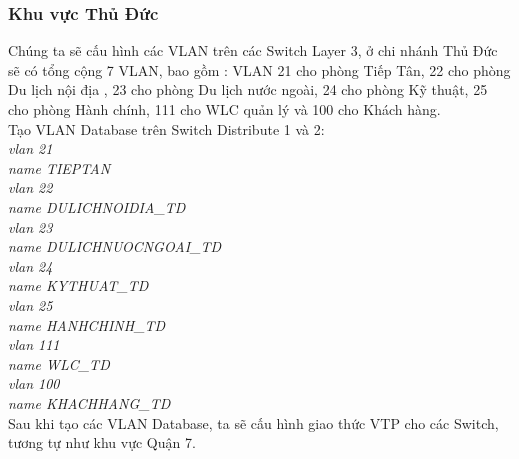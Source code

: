 \documentclass[a4paper, 12pt]{article}
\begin{document}
\subsubsection{Khu vực Thủ Đức}
\hspace*{1cm}Chúng ta sẽ cấu hình các VLAN trên các Switch Layer 3, ở chi nhánh Thủ Đức sẽ có tổng cộng 7 VLAN, bao gồm : VLAN 21 cho phòng Tiếp Tân, 22 cho phòng Du lịch nội địa , 23 cho phòng Du lịch nước ngoài, 24 cho phòng Kỹ thuật, 25 cho phòng Hành chính, 111 cho WLC quản lý và 100 cho Khách hàng.\\
\hspace*{1cm}Tạo VLAN Database trên Switch Distribute 1 và 2:\\
\hspace*{2cm}\textit{vlan 21\\
              \hspace*{2cm} name TIEPTAN\\
              \hspace*{2cm}  vlan 22\\
              \hspace*{2cm}  name DULICHNOIDIA\_TD\\
              \hspace*{2cm}    vlan 23\\
              \hspace*{2cm}    name DULICHNUOCNGOAI\_TD\\
              \hspace*{2cm}     vlan 24\\
              \hspace*{2cm}     name KYTHUAT\_TD\\
              \hspace*{2cm}     vlan 25\\
              \hspace*{2cm}     name HANHCHINH\_TD\\
              \hspace*{2cm}    vlan 111\\
              \hspace*{2cm}     name WLC\_TD\\
              \hspace*{2cm}      vlan 100\\
              \hspace*{2cm}    name KHACHHANG\_TD\\}
\hspace*{1cm}Sau khi tạo các VLAN Database, ta sẽ cấu hình giao thức VTP cho các Switch, tương tự như khu vực Quận 7.
\end{document}
